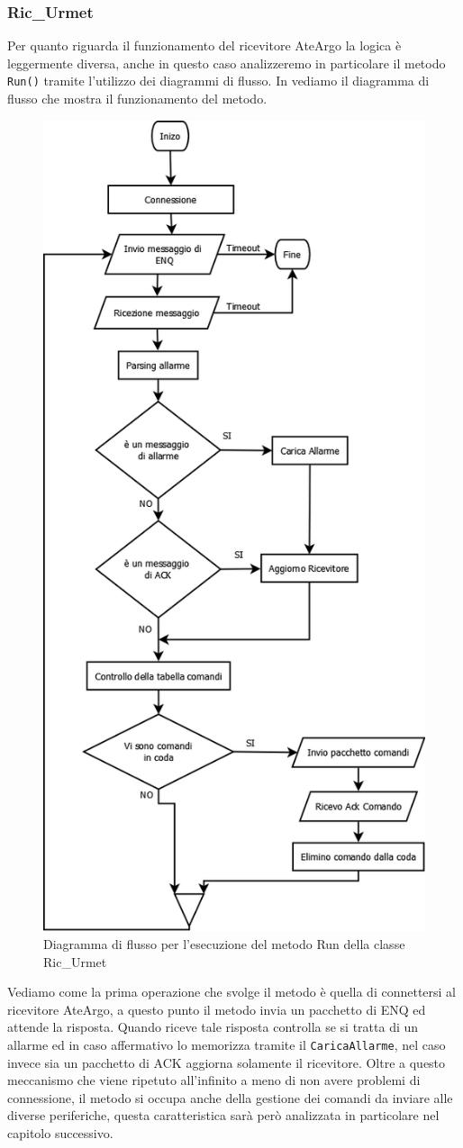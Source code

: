 \subsubsection{Ric\_Urmet}\label{algourmet}
Per quanto riguarda il funzionamento del ricevitore AteArgo la logica è leggermente diversa, anche in questo caso analizzeremo in particolare il metodo \texttt{Run()} tramite l'utilizzo dei diagrammi di flusso. In  vediamo il diagramma di flusso che mostra il funzionamento del metodo.
\begin{figure}
	\centering
	\includegraphics[width=0.7\linewidth]{pictures/runurmet.png}
	\caption{Diagramma di flusso per l'esecuzione del metodo Run della classe Ric\_Urmet}\label{fig:urmetrun}
\end{figure}
Vediamo come la prima operazione che svolge il metodo è quella di connettersi al ricevitore AteArgo, a questo punto il metodo invia un pacchetto di ENQ ed attende la risposta. Quando riceve tale risposta controlla se si tratta di un allarme ed in caso affermativo lo memorizza tramite il \texttt{CaricaAllarme}, nel caso invece sia un pacchetto di ACK aggiorna solamente il ricevitore. Oltre a questo meccanismo che viene ripetuto all'infinito a meno di non avere problemi di connessione, il metodo si occupa anche della gestione dei comandi da inviare alle diverse periferiche, questa caratteristica sarà però analizzata in particolare nel capitolo successivo.
